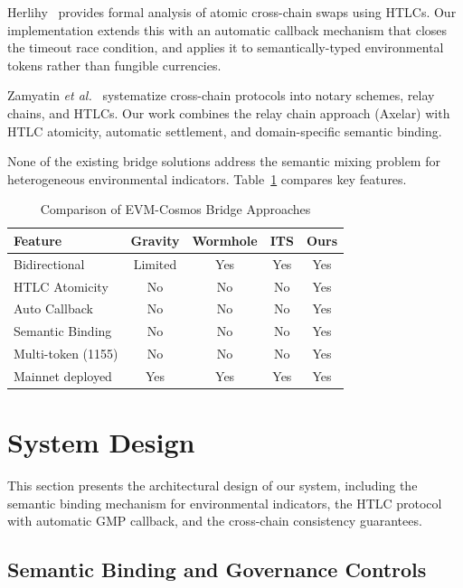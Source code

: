 \documentclass[conference,10pt]{IEEEtran}
\newcommand{\etal}{\textit{et al.}}
\begin{document}
Herlihy~\cite{herlihy2018} provides formal analysis of atomic cross-chain swaps using HTLCs. Our implementation extends this with an automatic callback mechanism that closes the timeout race condition, and applies it to semantically-typed environmental tokens rather than fungible currencies.

Zamyatin \etal~\cite{zamyatin2021} systematize cross-chain protocols into notary schemes, relay chains, and HTLCs. Our work combines the relay chain approach (Axelar) with HTLC atomicity, automatic settlement, and domain-specific semantic binding.

None of the existing bridge solutions address the semantic mixing problem for heterogeneous environmental indicators. Table~\ref{tab:bridges} compares key features.

\begin{table}[t]
\centering
\caption{Comparison of EVM-Cosmos Bridge Approaches}
\label{tab:bridges}
\footnotesize
\begin{tabular}{@{}lcccc@{}}
\toprule
\textbf{Feature} & \textbf{Gravity} & \textbf{Wormhole} & \textbf{ITS} & \textbf{Ours} \\
\midrule
Bidirectional & Limited & Yes & Yes & Yes \\
HTLC Atomicity & No & No & No & Yes \\
Auto Callback & No & No & No & Yes \\
Semantic Binding & No & No & No & Yes \\
Multi-token (1155) & No & No & No & Yes \\
Mainnet deployed & Yes & Yes & Yes & Yes \\
\bottomrule
\end{tabular}
\end{table}

\section{System Design}
\label{sec:design}

This section presents the architectural design of our system, including the semantic binding mechanism for environmental indicators, the HTLC protocol with automatic GMP callback, and the cross-chain consistency guarantees.

\subsection{Semantic Binding and Governance Controls}
\label{sec:semantic-binding}
\end{document}
